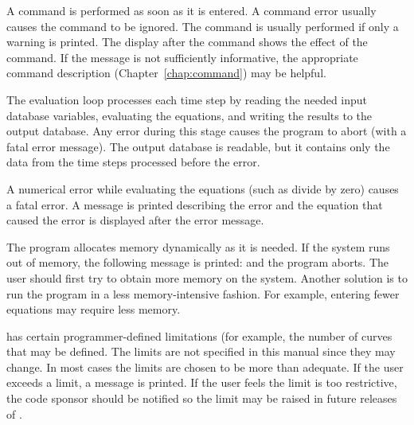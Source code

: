 A command is performed as soon as it is entered. A command error usually
causes the command to be ignored. The command is usually performed if
only a warning is printed. The display after the command shows the
effect of the command. If the message is not sufficiently informative,
the appropriate command description (Chapter~\ref{chap:command}) may be
helpful. 

The evaluation loop processes each time step by reading the needed input
database variables, evaluating the equations, and writing the results to
the output database. Any error during this stage causes the program to
abort (with a fatal error message). The output database is readable, but
it contains only the data from the time steps processed before the
error.

A numerical error while evaluating the equations (such as divide by
zero) causes a fatal error. A message is printed describing the error
and the equation that caused the error is displayed after the error
message.

The program allocates memory dynamically as it is needed. If the system
runs out of memory, the following message is printed:
and the program aborts. The user should first try to obtain more memory
on the system. Another solution is to run the program in a less
memory-intensive fashion. For example, entering fewer equations may
require less memory.

\caps{\PROGRAM} has certain programmer-defined limitations (for example,
the number of curves that may be defined. The limits are not specified
in this manual since they may change. In most cases the limits are
chosen to be more than adequate. If the user exceeds a limit, a message
is printed. If the user feels the limit is too restrictive, the code
sponsor should be notified so the limit may be raised in future releases
of \caps{\PROGRAM}.
